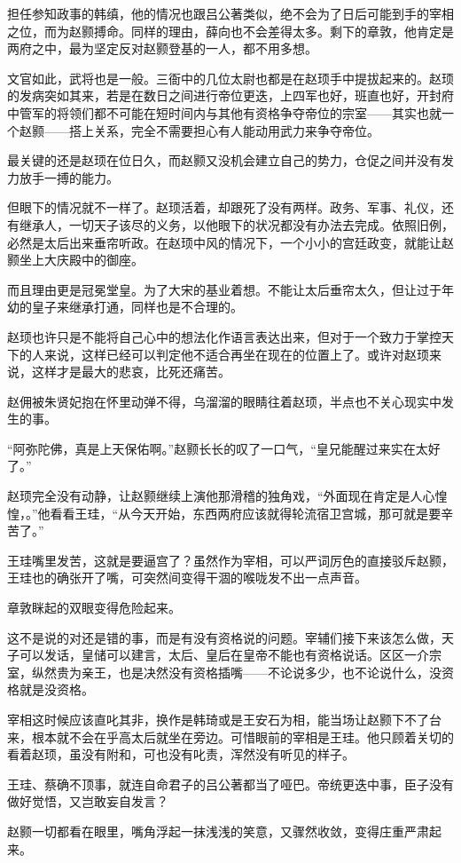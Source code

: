 担任参知政事的韩缜，他的情况也跟吕公著类似，绝不会为了日后可能到手的宰相之位，而为赵颢搏命。同样的理由，薛向也不会差得太多。剩下的章敦，他肯定是两府之中，最为坚定反对赵颢登基的一人，都不用多想。

文官如此，武将也是一般。三衙中的几位太尉也都是在赵顼手中提拔起来的。赵顼的发病突如其来，若是在数日之间进行帝位更迭，上四军也好，班直也好，开封府中管军的将领们都不可能在短时间内与其他有资格争夺帝位的宗室——其实也就一个赵颢——搭上关系，完全不需要担心有人能动用武力来争夺帝位。

最关键的还是赵顼在位日久，而赵颢又没机会建立自己的势力，仓促之间并没有发力放手一搏的能力。

但眼下的情况就不一样了。赵顼活着，却跟死了没有两样。政务、军事、礼仪，还有继承人，一切天子该尽的义务，以他眼下的状况都没有办法去完成。依照旧例，必然是太后出来垂帘听政。在赵顼中风的情况下，一个小小的宫廷政变，就能让赵颢坐上大庆殿中的御座。

而且理由更是冠冕堂皇。为了大宋的基业着想。不能让太后垂帘太久，但让过于年幼的皇子来继承打通，同样也是不合理的。

赵顼也许只是不能将自己心中的想法化作语言表达出来，但对于一个致力于掌控天下的人来说，这样已经可以判定他不适合再坐在现在的位置上了。或许对赵顼来说，这样才是最大的悲哀，比死还痛苦。

赵佣被朱贤妃抱在怀里动弹不得，乌溜溜的眼睛往着赵顼，半点也不关心现实中发生的事。

“阿弥陀佛，真是上天保佑啊。”赵颢长长的叹了一口气，“皇兄能醒过来实在太好了。”

赵顼完全没有动静，让赵颢继续上演他那滑稽的独角戏，“外面现在肯定是人心惶惶，。”他看看王珪，“从今天开始，东西两府应该就得轮流宿卫宫城，那可就是要辛苦了。”

王珪嘴里发苦，这就是要逼宫了？虽然作为宰相，可以严词厉色的直接驳斥赵颢，王珪也的确张开了嘴，可突然间变得干涸的喉咙发不出一点声音。

章敦眯起的双眼变得危险起来。

这不是说的对还是错的事，而是有没有资格说的问题。宰辅们接下来该怎么做，天子可以发话，皇储可以建言，太后、皇后在皇帝不能也有资格说话。区区一介宗室，纵然贵为亲王，也是决然没有资格插嘴——不论说多少，也不论说什么，没资格就是没资格。

宰相这时候应该直叱其非，换作是韩琦或是王安石为相，能当场让赵颢下不了台来，根本就不会在乎高太后就坐在旁边。可惜眼前的宰相是王珪。他只顾着关切的看着赵顼，虽没有附和，可也没有叱责，浑然没有听见的样子。

王珪、蔡确不顶事，就连自命君子的吕公著都当了哑巴。帝统更迭中事，臣子没有做好觉悟，又岂敢妄自发言？

赵颢一切都看在眼里，嘴角浮起一抹浅浅的笑意，又骤然收敛，变得庄重严肃起来。

